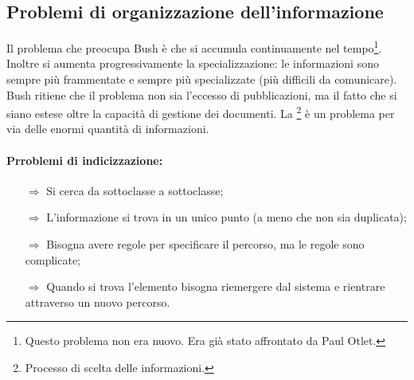 
\subsection{Problemi di organizzazione dell'informazione}

Il problema che preocupa Bush è  che si accumula
continuamente nel tempo\footnote{Questo problema non era nuovo. 
Era già stato affrontato da Paul Otlet.}. Inoltre si aumenta progressivamente la
specializzazione: le informazioni sono sempre più frammentate e sempre più
specializzate (più difficili da comunicare). Bush ritiene che il problema 
non sia l'eccesso di pubblicazioni, ma il fatto che si siano estese oltre
la capacità di gestione dei documenti. 
La \footnote{Processo di scelta delle informazioni.}
è un problema per via delle enormi quantità di informazioni.



\paragraph{Prroblemi di indicizzazione:}

\begin{itemize}
    \item [$\Rightarrow$] Si cerca da sottoclasse a sottoclasse;
    \item [$\Rightarrow$] L'informazione si trova in un unico punto (a meno che non sia duplicata);
    \item [$\Rightarrow$] Bisogna avere regole per specificare il percorso, ma le regole sono complicate;
    \item [$\Rightarrow$] Quando si trova l'elemento bisogna riemergere dal sistema e rientrare attraverso un nuovo percorso.
\end{itemize}

